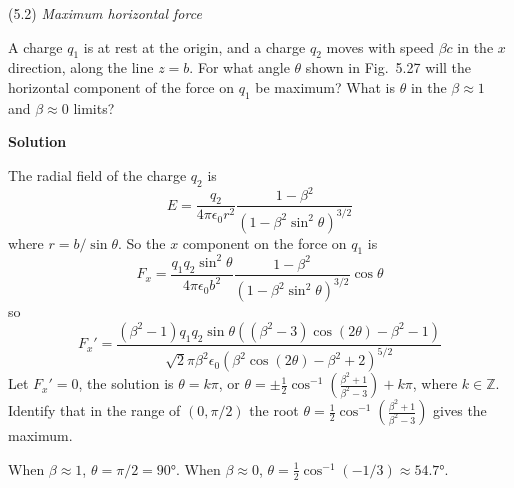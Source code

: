 \documentclass{article}
\begin{document}
\maketitle
\newpage





\begin{homeworkProblem}
	(5.2) \textit{Maximum horizontal force}

	A charge $q_1$ is at rest at the origin, and a charge $q_2$ moves with speed $\beta c$ in the $x$ direction, along the line $z=b$. For what angle $\theta$ shown in Fig.~5.27 will the horizontal component of the force on $q_1$ be maximum? What is $\theta$ in the $\beta\approx1$ and $\beta\approx0$ limits?

	\textbf{Solution}

	The radial field of the charge $q_2$ is
	\[
		E=\frac{q_2}{4\pi\epsilon_0 r^2}\frac{1-\beta^2}{\left(1-\beta^2\sin^2\theta\right)^{3/2}}
	\]
	where $r=b/\sin\theta$. So the $x$ component on the force on $q_1$ is
	\[
		F_x=\frac{q_1q_2\sin^2\theta}{4\pi\epsilon_0 b^2}\frac{1-\beta^2}{\left(1-\beta^2\sin^2\theta\right)^{3/2}}\cos\theta
	\]
	so
	\[
		{F_x}'=\frac{\left(\beta^2-1\right)q_1q_2\sin\theta\left(\left(\beta^2-3\right)\cos(2\theta)-\beta^2-1\right)}{\sqrt{2}\pi\beta^2\epsilon_0\left(\beta^2\cos(2\theta)-\beta^2+2\right)^{5/2}}
	\]
	Let ${F_x}'=0$, the solution is $\theta=k\pi$, or $\theta=\pm\frac{1}{2}\cos^{-1}\left(\frac{\beta^2+1}{\beta^2-3}\right)+k\pi$, where $k\in\mathbb{Z}$. Identify that in the range of $(0,\pi/2)$ the root $\theta=\frac{1}{2}\cos^{-1}\left(\frac{\beta^2+1}{\beta^2-3}\right)$ gives the maximum.

	When $\beta\approx1$, $\theta=\pi/2=\ang{90}$. When $\beta\approx0$, $\theta=\frac{1}{2}\cos^{-1}(-1/3)\approx\ang{54.7}$.
\end{homeworkProblem}
\end{document}
